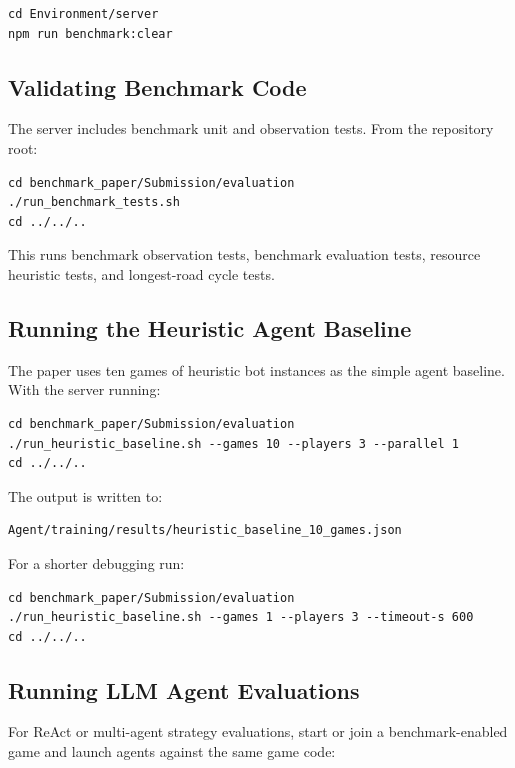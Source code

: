 \documentclass{article}
\begin{document}
\begin{verbatim}
cd Environment/server
npm run benchmark:clear
\end{verbatim}

\subsection{Validating Benchmark Code}

The server includes benchmark unit and observation tests. From the repository root:

\begin{verbatim}
cd benchmark_paper/Submission/evaluation
./run_benchmark_tests.sh
cd ../../..
\end{verbatim}

This runs benchmark observation tests, benchmark evaluation tests, resource heuristic tests, and longest-road cycle tests.

\subsection{Running the Heuristic Agent Baseline}

The paper uses ten games of heuristic bot instances as the simple agent baseline. With the server running:

\begin{verbatim}
cd benchmark_paper/Submission/evaluation
./run_heuristic_baseline.sh --games 10 --players 3 --parallel 1
cd ../../..
\end{verbatim}

The output is written to:

\begin{verbatim}
Agent/training/results/heuristic_baseline_10_games.json
\end{verbatim}

For a shorter debugging run:

\begin{verbatim}
cd benchmark_paper/Submission/evaluation
./run_heuristic_baseline.sh --games 1 --players 3 --timeout-s 600
cd ../../..
\end{verbatim}

\subsection{Running LLM Agent Evaluations}

For ReAct or multi-agent strategy evaluations, start or join a benchmark-enabled game and launch agents against the same game code:
\end{document}
